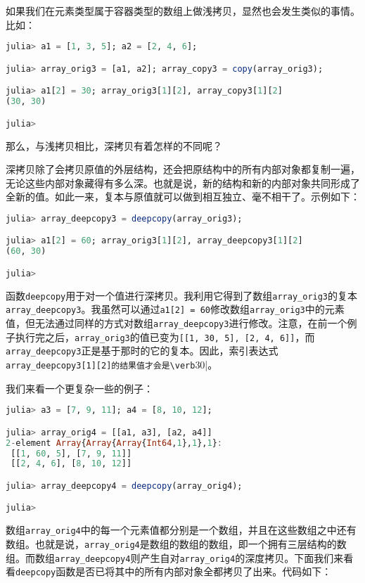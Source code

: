 如果我们在元素类型属于容器类型的数组上做浅拷贝，显然也会发生类似的事情。比如：

\begin{lstlisting}[language=julia]
julia> a1 = [1, 3, 5]; a2 = [2, 4, 6];

julia> array_orig3 = [a1, a2]; array_copy3 = copy(array_orig3);

julia> a1[2] = 30; array_orig3[1][2], array_copy3[1][2]
(30, 30)

julia> 
\end{lstlisting}

那么，与浅拷贝相比，深拷贝有着怎样的不同呢？

深拷贝除了会拷贝原值的外层结构，还会把原结构中的所有内部对象都复制一遍，无论这些内部对象藏得有多么深。也就是说，新的结构和新的内部对象共同形成了全新的值。如此一来，复本与原值就可以做到相互独立、毫不相干了。示例如下：

\begin{lstlisting}[language=julia]
julia> array_deepcopy3 = deepcopy(array_orig3);

julia> a1[2] = 60; array_orig3[1][2], array_deepcopy3[1][2]
(60, 30)

julia> 
\end{lstlisting}

函数\verb`deepcopy`用于对一个值进行深拷贝。我利用它得到了数组\verb`array_orig3`的复本\verb`array_deepcopy3`。我虽然可以通过\verb`a1[2] = 60`修改数组\verb`array_orig3`中的元素值，但无法通过同样的方式对数组\verb`array_deepcopy3`进行修改。注意，在前一个例子执行完之后，\verb`array_orig3`的值已变为\verb`[[1, 30, 5], [2, 4, 6]]`，而\verb`array_deepcopy3`正是基于那时的它的复本。因此，索引表达式\verb`array_deepcopy3[1][2]的结果值才会是\verb`30|。

我们来看一个更复杂一些的例子：

\begin{lstlisting}[language=julia]
julia> a3 = [7, 9, 11]; a4 = [8, 10, 12];

julia> array_orig4 = [[a1, a3], [a2, a4]]
2-element Array{Array{Array{Int64,1},1},1}:
 [[1, 60, 5], [7, 9, 11]]
 [[2, 4, 6], [8, 10, 12]]

julia> array_deepcopy4 = deepcopy(array_orig4);

julia> 
\end{lstlisting}

数组\verb`array_orig4`中的每一个元素值都分别是一个数组，并且在这些数组之中还有数组。也就是说，\verb`array_orig4`是数组的数组的数组，即一个拥有三层结构的数组。而数组\verb`array_deepcopy4`则产生自对\verb`array_orig4`的深度拷贝。下面我们来看看\verb`deepcopy`函数是否已将其中的所有内部对象全都拷贝了出来。代码如下：

